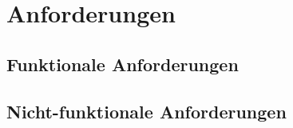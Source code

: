\chapter{Anforderungen}\label{ch:anforderungen}

\section{Funktionale Anforderungen}\label{sec:funktionale-anforderungen}

\section{Nicht-funktionale Anforderungen}\label{sec:nicht-funktionale-anforderungen}

